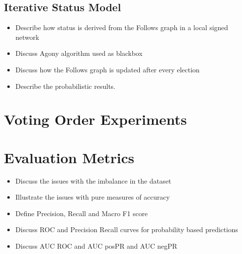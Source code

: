     \subsection{Iterative Status Model}
        \begin{itemize} 
            \item Describe how status is derived from the Follows graph in a local signed network 
            \item Discuss Agony algorithm used as blackbox
            \item Discuss how the Follows graph is updated after every election
            \item Describe the probabilistic results.
        \end{itemize}

\section{Voting Order Experiments}
\label{sec:voting-order}


\section{Evaluation Metrics}
\label{sec:eval-metrics}
\begin{itemize}
    \item Discuss the issues with the imbalance in the dataset
    \item Illustrate the issues with pure measures of accuracy
    \item Define Precision, Recall and Macro F1 score
    \item Discuss ROC and Precision Recall curves for probability based predictions 
    \item Discuss AUC ROC and AUC posPR and AUC negPR
\end{itemize}